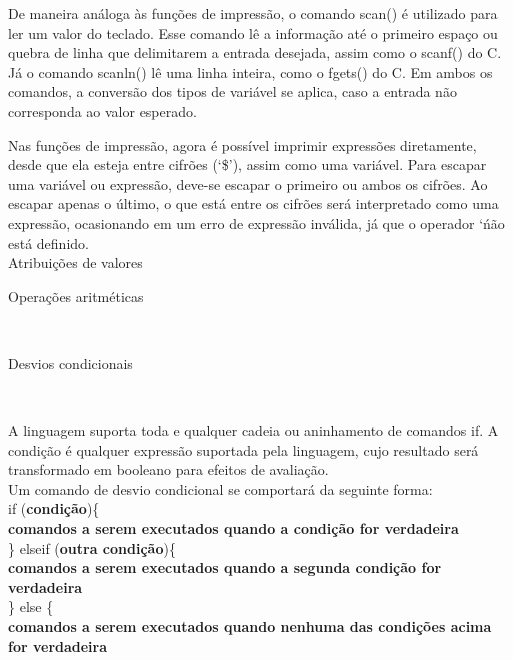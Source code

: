 \documentclass[12pt,a4paper]{article}
\def\emph#1{\textbf{#1}} %
\begin{document}
De maneira análoga às funções de impressão, o comando scan() é utilizado para ler um valor do teclado. Esse comando lê a informação até o primeiro espaço ou quebra de linha que delimitarem a entrada desejada, assim como o scanf() do C. Já o comando scanln() lê uma linha inteira, como o fgets() do C. Em ambos os comandos, a conversão dos tipos de variável se aplica, caso a entrada não corresponda ao valor esperado.

Nas funções de impressão, agora é possível imprimir expressões diretamente, desde que ela esteja entre cifrões (`\$'), assim como uma variável. Para escapar uma variável ou expressão, deve-se escapar o primeiro ou ambos os cifrões. Ao escapar apenas o último, o que está entre os cifrões será interpretado como uma expressão, ocasionando em um erro de expressão inválida, já que o operador `\' não está definido.\\

\hypertarget{Atribuições de valores}{\Large{Atribuições de valores}}\\[0.3cm]
\normalsize

\hypertarget{Operações aritméticas}{\Large{Operações aritméticas}}\\[0.3cm]
\normalsize

\hypertarget{Desvios condicionais}{\Large{Desvios condicionais}}\\[0.3cm]
\normalsize

A linguagem suporta toda e qualquer cadeia ou aninhamento de comandos if. A condição é qualquer expressão suportada pela linguagem, cujo resultado será transformado em booleano para efeitos de avaliação.\\

Um comando de desvio condicional se comportará da seguinte forma: \\

if (\emph{condição})\{ \\

\emph{comandos a serem executados quando a condição for verdadeira} \\

\} elseif (\emph{outra condição})\{\\

\emph{comandos a serem executados quando a segunda condição for verdadeira} \\

\} else \{\\


\emph{comandos a serem executados quando nenhuma das condições acima for verdadeira} \\
\end{document}
